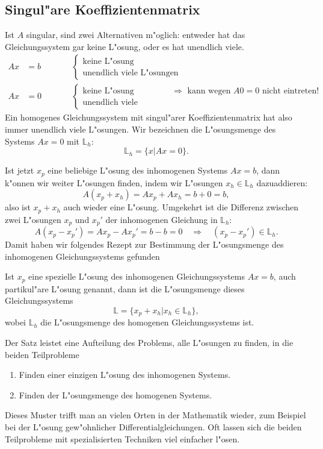 \subsection{Singul"are Koeffizientenmatrix}
Ist $A$ singular, sind zwei Alternativen m"oglich: entweder hat das
Gleichungssystem gar keine L"osung, oder es hat unendlich viele.
\begin{align*}
Ax&=b&\qquad&\begin{cases}
\text{keine L"osung}\\
\text{unendlich viele L"osungen}
\end{cases}
\\
Ax&=0&\qquad&\begin{cases}
\text{keine L"osung}&\text{$\Rightarrow$ kann wegen $A0=0$ nicht eintreten!}\\
\text{unendlich viele L"osungen}&
\end{cases}
\end{align*}
Ein homogenes Gleichungssystem mit singul"arer Koeffizientenmatrix hat also
immer unendlich viele L"osungen. Wir bezeichnen die L"osungsmenge des
Systems $Ax=0$ mit $\mathbb L_h$:
$$
\mathbb L_h=\{x|Ax=0\}.
$$

Ist jetzt $x_p$ eine beliebige L"osung des inhomogenen Systems $Ax=b$, dann
k"onnen wir weiter L"osungen finden, indem wir L"osungen $x_h\in\mathbb L_h$
dazuaddieren:
$$A(x_p+x_h)=Ax_p+Ax_h=b+0=b,$$
also ist $x_p+x_h$ auch wieder eine L"osung. Umgekehrt ist die Differenz
zwischen zwei L"osungen $x_p$ und $x_p'$ der inhomogenen Gleichung in
$\mathbb L_h$:
$$A(x_p-x_p')=Ax_p-Ax_p'=b-b=0\quad\Rightarrow\quad (x_p-x_p')\in\mathbb L_h.$$
Damit haben wir folgendes Rezept zur Bestimmung der L"osungsmenge des
inhomogenen Gleichungssystems gefunden
\begin{satz}
Ist $x_p$ eine spezielle L"osung des inhomogenen Gleichungssystems $Ax=b$,
auch partikul"are L"osung genannt,
dann ist die L"osungsmenge dieses Gleichungssystems 
$$\mathbb L=\{x_p+x_h|x_h\in\mathbb L_h\},$$
wobei $\mathbb L_h$ die L"osungsmenge des homogenen Gleichungssystems ist.
\end{satz}
Der Satz leistet eine Aufteilung des Problems, alle L"osungen zu finden,
in die beiden Teilprobleme
\begin{enumerate}
\item Finden einer einzigen L"osung des inhomogenen Systems.
\item Finden der L"osungsmenge des homogenen Systems.
\end{enumerate}
Dieses Muster trifft man an vielen Orten in der Mathematik wieder, zum
Beispiel bei der L"osung gew"ohnlicher Differentialgleichungen.
Oft lassen sich die beiden Teilprobleme mit spezialisierten Techniken
viel einfacher l"osen.

